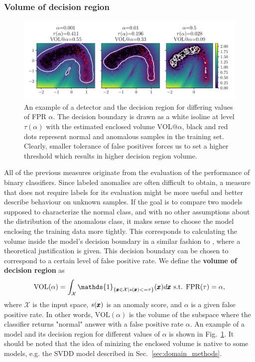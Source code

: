 \subsubsection{Volume of decision region}
\begin{figure}
\centering
\includegraphics[scale=0.8]{data/chapter_intro/fig_vol_example.pdf}
\caption{An example of a detector and the decision region for differing values of FPR $\alpha$. The decision boundary is drawn as a white isoline at level $\tau(\alpha)$ with the estimated enclosed volume $\text{VOL@}\alpha$, black and red dots represent normal and anomalous samples in the training set. Clearly, smaller tolerance of false positives forces us to set a higher threshold which results in higher decision region volume.}
\label{fig:vol_example}
\end{figure}
All of the previous measures originate from the evaluation of the performance of binary classifiers. Since labeled anomalies are often difficult to obtain, a measure that does not require labels for its evaluation might be more useful and better describe behaviour on unknown samples. If the goal is to compare two models supposed to characterize the normal class, and with no other assumptions about the distribution of the anomalous class, it makes sense to choose the model enclosing the training data more tightly. This corresponds to calculating the volume inside the model's decision boundary in a similar fashion to \cite{clemenccon2013scoring}, where a theoretical justification is given. This decision boundary can be chosen to correspond to a certain level of false positive rate. We define the \textbf{volume of decision region} as
\begin{equation}
  \text{VOL}(\alpha) = \int_{\mathcal{X}} \mathds{1}_{\lbrace \vc{x} \in\mathcal{X}|s(\vc{x}) <= \tau\rbrace} \left( \vc{x} \right) d\vc{x}  \text{ s.t. } \text{FPR}(\tau)=\alpha,
\end{equation}
where $\mathcal{X}$ is the input space, $s(\pmb{{x}})$ is an anomaly score, and $\alpha$ is a given false positive rate. In other words, $\text{VOL}(\alpha)$ is the volume of the subspace where the classifier returns "normal" answer with a false positive rate $\alpha$. An example of a model and its decision region for different values of $\alpha$ is shown in Fig.~\ref{fig:vol_example}. It should be noted that the idea of minizing the enclosed volume is native to some models, e.g. the SVDD model described in Sec.~\ref{sec:domain_methods}.

